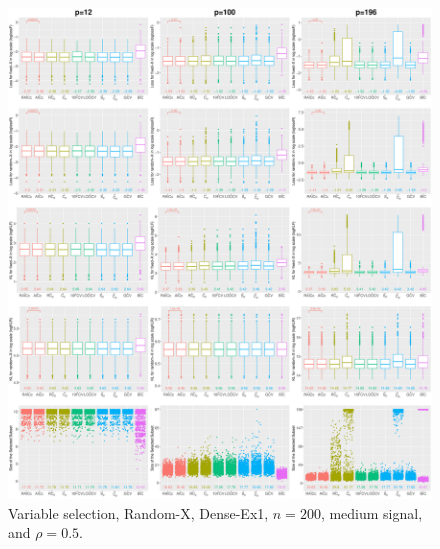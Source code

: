 \begin{figure}[!ht]
\centering
\includegraphics[width=\textwidth]{figures/supplement/randomx/subset_selection/Dense-Ex1_n200_msnr_rho05.eps}
\caption{Variable selection, Random-X, Dense-Ex1, $n=200$, medium signal, and $\rho=0.5$.}
\end{figure}
\clearpage
